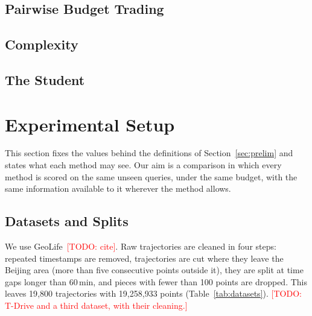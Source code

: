 \documentclass[conference]{IEEEtran}
\newcommand{\todo}[1]{\textcolor{red}{[TODO: #1]}}
\begin{document}
\subsection{Pairwise Budget Trading}
\label{sec:trading}

\subsection{Complexity}
\label{sec:complexity}

\subsection{The Student}
\label{sec:student}

\section{Experimental Setup}
\label{sec:setup}

This section fixes the values behind the definitions of Section~\ref{sec:prelim} and states what
each method may see. Our aim is a comparison in which every method is scored on the same unseen
queries, under the same budget, with the same information available to it wherever the method
allows.

\subsection{Datasets and Splits}
\label{sec:datasets}

We use GeoLife~\todo{cite}. Raw trajectories are cleaned in four steps: repeated timestamps are
removed, trajectories are cut where they leave the Beijing area (more than five consecutive points
outside it), they are split at time gaps longer than 60\,min, and pieces with fewer than 100 points
are dropped. This leaves 19{,}800 trajectories with 19{,}258{,}933 points
(Table~\ref{tab:datasets}). \todo{T-Drive and a third dataset, with their cleaning.}
\end{document}

